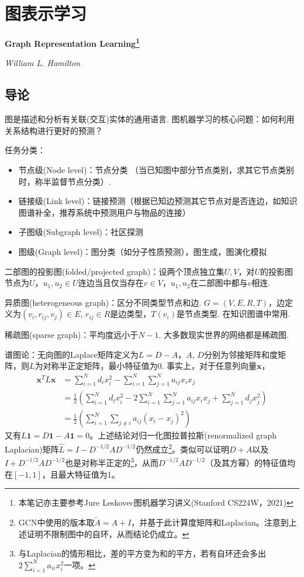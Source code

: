 
\chapter{图表示学习}
\Large\textbf{Graph Representation Learning\footnote{本笔记亦主要参考Jure Leskovec图机器学习讲义(Stanford CS224W，2021)}}
\par \emph{William L. Hamilton} \normalsize

\section{导论}

\par 图是描述和分析有关联(交互)实体的通用语言. 图机器学习的核心问题：如何利用关系结构进行更好的预测？

\par 任务分类：
\begin{itemize}
    \item 节点级(Node level)：节点分类 （当已知图中部分节点类别，求其它节点类别时，称半监督节点分类）. 
    \item 链接级(Link level)：链接预测（根据已知边预测其它节点对是否连边，如知识图谱补全，推荐系统中预测用户与物品的连接）
    \item 子图级(Subgraph level)：社区探测
    \item 图级(Graph level)：图分类（如分子性质预测），图生成，图演化模拟
\end{itemize}

\par 二部图的投影图(folded/projected graph)：设两个顶点独立集$U,V$，对$U$的投影图节点为$U$，$u_1,u_2\in U$连边当且仅当存在$v\in V$，$u_1,u_2$在二部图中都与$v$相连. 

\par 异质图(heterogeneous graph)：区分不同类型节点和边.  $G=(V,E,R,T)$，边定义为$(v_i,r_{ij},v_j)\in E$, $r_{ij}\in R$是边类型，$T(v_i)$是节点类型. 在知识图谱中常用. 

\par 稀疏图(sparse graph)：平均度远小于$N-1$. 大多数现实世界的网络都是稀疏图.

\par 谱图论：无向图的Laplace矩阵定义为$L=D-A$，$A$, $D$分别为邻接矩阵和度矩阵，则$L$为对称半正定矩阵，最小特征值为0. 事实上，对于任意列向量$\mathbf{x}$，
\begin{align}
\mathbf{x}^TL\mathbf{x}&=\sum_{i=1}^N d_ix_i^2-\sum_{i=1}^N\sum_{j=1}^N a_{ij}x_ix_j\\
&=\frac{1}{2}\left(\sum_{i=1}^N d_ix_i^2-2\sum_{i=1}^N\sum_{j=1}^N a_{ij}x_ix_j+\sum_{j=1}^N d_jx_j^2\right)\\
&=\frac{1}{2}\left(\sum_{i=1}^N \sum_{j\neq i}a_{ij}(x_i-x_j)^2\right)
\end{align}
又有$L\mathbf{1}=D\mathbf{1}-A\mathbf{1}=0$。上述结论对归一化图拉普拉斯(renormalized graph Laplacian)矩阵$\hat{L}=I-D^{-1/2}AD^{-1/2}$仍然成立\footnote{GCN中使用的版本取$\tilde{A}=A+I$，并基于此计算度矩阵和Laplacian。注意到上述证明不限制图中的自环，从而结论仍成立。}。类似可以证明$D+A$以及$I+D^{-1/2}AD^{-1/2}$也是对称半正定的\footnote{与Laplacian的情形相比，差的平方变为和的平方，若有自环还会多出$2\sum_{i=1}^N a_{ii}x_i^2$一项。}，从而$D^{-1/2}AD^{-1/2}$（及其方幂）的特征值均在$[-1,1]$，且最大特征值为1。

